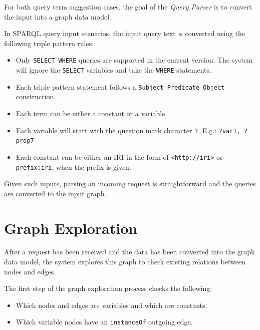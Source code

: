 For both query term suggestion cases, the goal of the \textit{Query Parser} is to convert the input into a graph data model.

In SPARQL query input scenarios, the input query text is converted using the following triple pattern rules:
\begin{itemize}
    \item Only \texttt{SELECT WHERE} queries are supported in the current version. The system will ignore the \texttt{SELECT} variables and take the \texttt{WHERE} statements.
    \item Each triple pattern statement follows a \texttt{Subject Predicate Object} construction.
    \item Each term can be either a constant or a variable.
    \item Each variable will start with the question mark character \texttt{?}. E.g.: \texttt{?var1, ?prop7}
    \item Each constant can be either an IRI in the form of \texttt{<http://iri>} or \texttt{prefix:iri}, when the prefix is given.
\end{itemize}

Given such inputs, parsing an incoming request is straightforward and the queries are converted to the input graph.


\section{Graph Exploration}
\label{chap:graph_exploration}

After a request has been received and the data has been converted into the graph data model, the system explores this graph to check existing relations between nodes and edges. 

The first step of the graph exploration process checks the following:
\begin{itemize}
    \item Which nodes and edges are variables and which are constants.
    \item Which variable nodes have an \texttt{instanceOf} outgoing edge.
\end{itemize}


